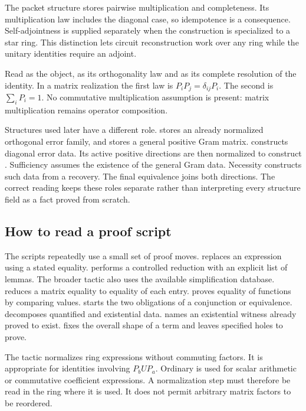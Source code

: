 The packet structure stores pairwise multiplication and completeness. Its multiplication law includes the diagonal case, so idempotence is a consequence. Self-adjointness is supplied separately when the construction is specialized to a star ring. This distinction lets circuit reconstruction work over any ring while the unitary identities require an adjoint.


Read  as the object,  as its orthogonality law and  as its complete resolution of the identity. In a matrix realization the first law is $P_iP_j=\delta_{ij}P_i$. The second is $\sum_iP_i=1$. No commutative multiplication assumption is present: matrix multiplication remains operator composition.

Structures used later have a different role.  stores an already normalized orthogonal error family, and  stores a general positive Gram matrix.  constructs diagonal error data. Its active positive directions are then normalized to construct . Sufficiency assumes the existence of the general Gram data. Necessity constructs such data from a recovery. The final equivalence joins both directions. The correct reading keeps these roles separate rather than interpreting every structure field as a fact proved from scratch.

\subsection{How to read a proof script}
The scripts repeatedly use a small set of proof moves.  replaces an expression using a stated equality.  performs a controlled reduction with an explicit list of lemmas. The broader  tactic also uses the available simplification database.  reduces a matrix equality to equality of each entry.  proves equality of functions by comparing values.  starts the two obligations of a conjunction or equivalence.  decomposes quantified and existential data.  names an existential witness already proved to exist.  fixes the overall shape of a term and leaves specified holes to prove.

The tactic  normalizes ring expressions without commuting factors. It is appropriate for identities involving $P_bUP_a$. Ordinary  is used for scalar arithmetic or commutative coefficient expressions. A normalization step must therefore be read in the ring where it is used. It does not permit arbitrary matrix factors to be reordered.

